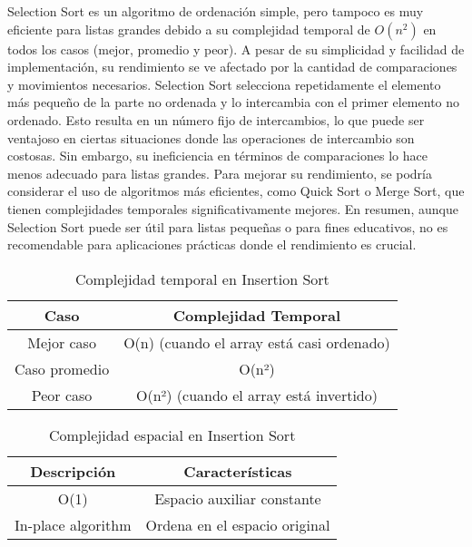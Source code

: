 \vspace{5cm}
Selection Sort es un algoritmo de ordenación simple, pero tampoco es muy eficiente para listas grandes debido a su complejidad temporal de \(O(n^2)\) en todos los casos (mejor, promedio y peor). A pesar de su simplicidad y facilidad de implementación, su rendimiento se ve afectado por la cantidad de comparaciones y movimientos necesarios. Selection Sort selecciona repetidamente el elemento más pequeño de la parte no ordenada y lo intercambia con el primer elemento no ordenado. Esto resulta en un número fijo de intercambios, lo que puede ser ventajoso en ciertas situaciones donde las operaciones de intercambio son costosas. Sin embargo, su ineficiencia en términos de comparaciones lo hace menos adecuado para listas grandes. Para mejorar su rendimiento, se podría considerar el uso de algoritmos más eficientes, como Quick Sort o Merge Sort, que tienen complejidades temporales significativamente mejores. En resumen, aunque Selection Sort puede ser útil para listas pequeñas o para fines educativos, no es recomendable para aplicaciones prácticas donde el rendimiento es crucial.

\begin{table}[h]
    \centering
    \begin{tabular}{|c|c|}
        \hline
        \textbf{Caso} & \textbf{Complejidad Temporal} \\
        \hline
        Mejor caso & O(n) (cuando el array está casi ordenado) \\
        \hline
        Caso promedio & O(n²) \\
        \hline
        Peor caso & O(n²) (cuando el array está invertido) \\
        \hline
    \end{tabular}
    \caption{Complejidad temporal en Insertion Sort}
    \label{tab:complejidad_casos}
\end{table}

\begin{table}[h]
    \centering
    \begin{tabular}{|c|c|}
        \hline
        \textbf{Descripción} & \textbf{Características} \\
        \hline
        O(1) & Espacio auxiliar constante \\
        \hline
        In-place algorithm & Ordena en el espacio original \\
        \hline
    \end{tabular}
    \caption{Complejidad espacial en Insertion Sort}
    \label{tab:caracteristicas_espacial}
\end{table}

